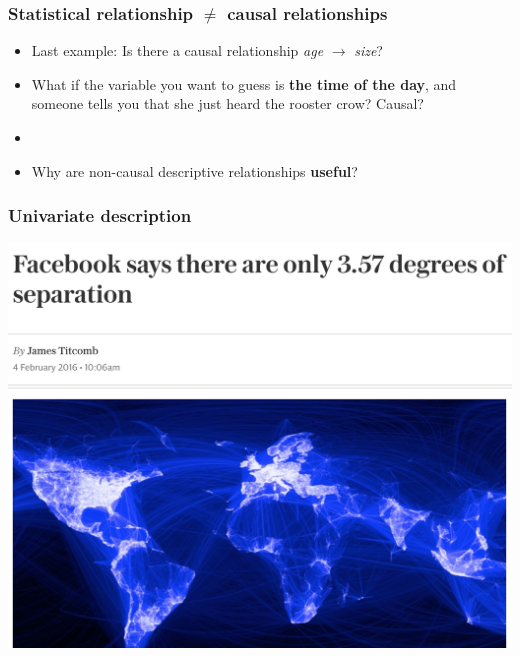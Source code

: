 \documentclass[aspectratio=43]{beamer}
\begin{document}
\begin{frame}
\frametitle{Statistical relationship $\neq$ causal relationships}
\centering

\begin{itemize}
  \item<1-> Last example: Is there a causal relationship \textit{age} $\rightarrow$ \textit{size}?
  \item<2-> What if the variable you want to guess is \textbf{the time of the day}, and someone tells you that she just heard the rooster crow? Causal?
  \item[]
  \item<3-> Why are non-causal descriptive relationships \textbf{useful}?
\end{itemize}

\end{frame}

%
%

\begin{frame}
\frametitle{Univariate description}
\centering

\includegraphics[width = \textwidth]{../img/sixdegrees}

\end{frame}
\end{document}
